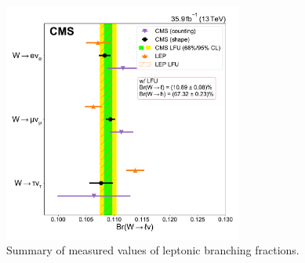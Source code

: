 \begin{table}[htb!]
    \centering
    \renewcommand{\arraystretch}{1.5}
    \caption{Correlation matrix of leptonic branching fractions.}
    \label{tab:results_corr}
\end{table}




            
\begin{figure}[htb!]
    \begin{center}
    \includegraphics[width=0.7\textwidth]{chapters/Analysis/sectionResult/figures/unblinded_summary_plot.pdf}
    \caption{Summary of measured values of leptonic branching fractions.}
    \label{fig:analysis:result:wbr_result_1D}
    \end{center}
\end{figure}


